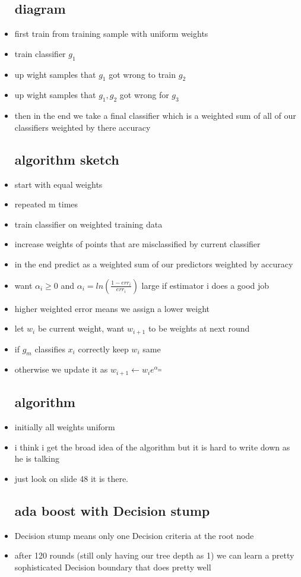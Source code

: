 \documentclass{article}
\begin{document}
\begin{itemize}
\subsection*{diagram}
\item first train from training sample with uniform weights
\item train classifier $g_1$ 
\item up wight samples that $g_1$ got wrong to train $g_2$
\item up wight samples that $g_1,g_2$ got wrong for $g_3$
\item then in the end we take a final classifier which is a weighted sum of all of our classifiers weighted by there accuracy
\subsection*{algorithm sketch}
\item start with equal weights
\item repeated m times
\item train classifier on weighted training data 
\item increase weights of points that are misclassified by current classifier
\item  in the end predict as a weighted sum of our predictors weighted by accuracy
\item want $\alpha_i\geq 0$ and $\alpha_i=ln(\frac{1-err_i}{err_i})$ large if estimator i does a good job
\item higher weighted error means we assign a lower weight
\item let $w_i$ be current weight, want $w_{i+1}$ to be weights at next round 
\item if $g_m$ classifies $x_i$ correctly keep $w_i$ same
\item otherwise we update it as $w_{i+1}\leftarrow w_ie^{\alpha_m}$
\subsection*{algorithm}
\item  initially all weights uniform
\item i think i get the broad idea of the algorithm but it is hard to write down as he is talking 
\item just look on slide 48 it is there.
\subsection*{ada boost with Decision stump}
\item Decision stump means only one Decision criteria at the root node
\item after 120 rounds (still only having our tree depth as 1) we can learn a pretty sophisticated Decision boundary that does pretty well

\end{itemize}
\end{document}
